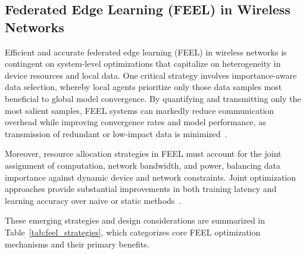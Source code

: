 \documentclass[sigconf]{acmart}
\begin{document}
\subsection{Federated Edge Learning (FEEL) in Wireless Networks}

Efficient and accurate federated edge learning (FEEL) in wireless networks is contingent on system-level optimizations that capitalize on heterogeneity in device resources and local data. One critical strategy involves importance-aware data selection, whereby local agents prioritize only those data samples most beneficial to global model convergence. By quantifying and transmitting only the most salient samples, FEEL systems can markedly reduce communication overhead while improving convergence rates and model performance, as transmission of redundant or low-impact data is minimized~\cite{ref42}. 

Moreover, resource allocation strategies in FEEL must account for the joint assignment of computation, network bandwidth, and power, balancing data importance against dynamic device and network constraints. Joint optimization approaches provide substantial improvements in both training latency and learning accuracy over naive or static methods~\cite{ref42}. 

These emerging strategies and design considerations are summarized in Table~\ref{tab:feel_strategies}, which categorizes core FEEL optimization mechanisms and their primary benefits.
\end{document}
